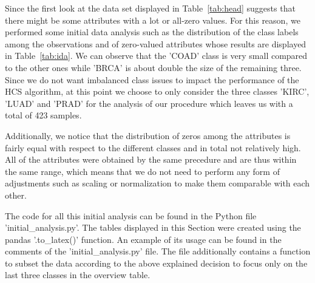 \documentclass[paper=a4,fontsize=11pt,DIV=8,BCOR=5mm,twoside,pdftex,bibtotocnumbered]{scrreprt}
\theoremstyle{plain}
\begin{document}
Since the first look at the data set displayed in Table~\ref{tab:head} suggests that there might be some attributes with a lot or all-zero values. For this reason, we performed some initial data analysis such as the distribution of the class labels among the observations and of zero-valued attributes whose results are displayed in Table~\ref{tab:ida}. We can observe that the 'COAD' class is very small compared to the other ones while 'BRCA' is about double the size of the remaining three. Since we do not want imbalanced class issues to impact the performance of the HCS algorithm, at this point we choose to only consider the three classes 'KIRC', 'LUAD' and 'PRAD' for the analysis of our procedure which leaves us with a total of 423 samples. 

Additionally, we notice that the distribution of zeros among the attributes is fairly equal with respect to the different classes and in total not relatively high. All of the attributes were obtained by the same precedure and are thus within the same range, which means that we do not need to perform any form of adjustments such as scaling or normalization to make them comparable with each other.

The code for all this initial analysis can be found in the Python file 'initial\_analysis.py'. The tables displayed in this Section were created using the pandas '.to\_latex()' function. An example of its usage can be found in the comments of the 'initial\_analysis.py' file. The file additionally contains a function to subset the data according to the above explained decision to focus only on the last three classes in the overview table.
\end{document}
